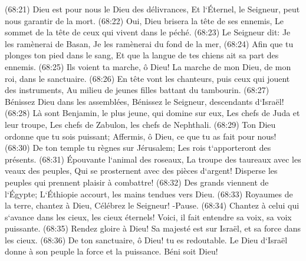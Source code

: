 \verse (68:21) Dieu est pour nous le Dieu des délivrances, Et l`Éternel, le Seigneur, peut nous garantir de la mort. 
\verse (68:22) Oui, Dieu brisera la tête de ses ennemis, Le sommet de la tête de ceux qui vivent dans le péché. 
\verse (68:23) Le Seigneur dit: Je les ramènerai de Basan, Je les ramènerai du fond de la mer, 
\verse (68:24) Afin que tu plonges ton pied dans le sang, Et que la langue de tes chiens ait sa part des ennemis. 
\verse (68:25) Ils voient ta marche, ô Dieu! La marche de mon Dieu, de mon roi, dans le sanctuaire. 
\verse (68:26) En tête vont les chanteurs, puis ceux qui jouent des instruments, Au milieu de jeunes filles battant du tambourin. 
\verse (68:27) Bénissez Dieu dans les assemblées, Bénissez le Seigneur, descendants d`Israël! 
\verse (68:28) Là sont Benjamin, le plus jeune, qui domine sur eux, Les chefs de Juda et leur troupe, Les chefs de Zabulon, les chefs de Nephthali. 
\verse (68:29) Ton Dieu ordonne que tu sois puissant; Affermis, ô Dieu, ce que tu as fait pour nous! 
\verse (68:30) De ton temple tu règnes sur Jérusalem; Les rois t`apporteront des présents. 
\verse (68:31) Épouvante l`animal des roseaux, La troupe des taureaux avec les veaux des peuples, Qui se prosternent avec des pièces d`argent! Disperse les peuples qui prennent plaisir à combattre! 
\verse (68:32) Des grands viennent de l`Égypte; L`Éthiopie accourt, les mains tendues vers Dieu. 
\verse (68:33) Royaumes de la terre, chantez à Dieu, Célébrez le Seigneur! -Pause. 
\verse (68:34) Chantez à celui qui s`avance dans les cieux, les cieux éternels! Voici, il fait entendre sa voix, sa voix puissante. 
\verse (68:35) Rendez gloire à Dieu! Sa majesté est sur Israël, et sa force dans les cieux. 
\verse (68:36) De ton sanctuaire, ô Dieu! tu es redoutable. Le Dieu d`Israël donne à son peuple la force et la puissance. Béni soit Dieu! 

\chapter{}

